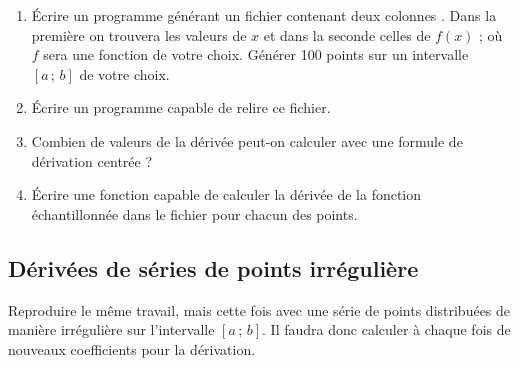 \begin{enumerate}
\item Écrire un programme générant un fichier contenant deux colonnes . Dans la première
on trouvera les valeurs de $x$ et dans la seconde celles de $f(x)$ ; où $f$ sera une fonction de votre choix. Générer 100 points sur un intervalle $[a\,;\,b]$ de votre choix. 
\item Écrire un programme capable de relire ce fichier.
\item Combien de valeurs de la dérivée peut-on calculer avec une formule de dérivation centrée ? 
\item Écrire une fonction capable de calculer la dérivée de la fonction échantillonnée dans le fichier pour chacun des points.
\end{enumerate}

\subsection{Dérivées de séries de points irrégulière}
Reproduire le même travail, mais cette fois avec une série de points distribuées de manière irrégulière sur l'intervalle $[a\,;\,b]$. Il faudra donc calculer à chaque fois de nouveaux coefficients pour la dérivation. 
